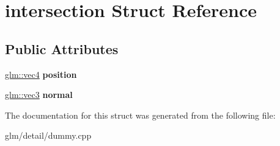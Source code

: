 \hypertarget{structintersection}{\section{intersection Struct Reference}
\label{structintersection}
}
\subsection*{Public Attributes}
\begin{DoxyCompactItemize}
\item 
\hypertarget{structintersection_a7a33f425d759e3e1240499a7f527b914}{\hyperlink{group__core__types_ga5881b1b022d7fd1b7218f5916532dd02}{glm\-::vec4} {\bfseries position}}\label{structintersection_a7a33f425d759e3e1240499a7f527b914}

\item 
\hypertarget{structintersection_a4db60aeaf032905a89ca8382914b44e4}{\hyperlink{group__core__types_ga1c47e8b3386109bc992b6c48e91b0be7}{glm\-::vec3} {\bfseries normal}}\label{structintersection_a4db60aeaf032905a89ca8382914b44e4}

\end{DoxyCompactItemize}


The documentation for this struct was generated from the following file\-:\begin{DoxyCompactItemize}
\item 
glm/detail/dummy.\-cpp\end{DoxyCompactItemize}
